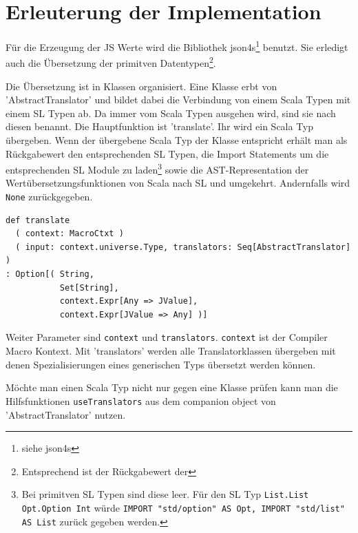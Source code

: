\documentclass[12pt]{scrreprt}
\begin{document}

\section{Erleuterung der Implementation}
\label{sec:trans-implementation}

Für die Erzeugung der JS Werte wird die Bibliothek json4s\footnote{siehe json4s} benutzt. Sie erledigt auch die Übersetzung der primitven Datentypen\footnote{Entsprechend ist der Rückgabewert der }.

Die Übersetzung ist in Klassen organisiert. Eine Klasse erbt von 'AbstractTranslator' und bildet dabei die Verbindung von einem Scala Typen mit einem \ac{SL} Typen ab. Da immer vom Scala Typen ausgehen wird, sind sie nach diesen benannt. Die Hauptfunktion ist 'translate'. Ihr wird ein Scala Typ übergeben. Wenn der übergebene Scala Typ der Klasse entspricht erhält man als Rückgabewert den entsprechenden \ac{SL} Typen, die Import Statements um die entsprechenden \ac{SL} Module zu laden\footnote{Bei primitven \ac{SL} Typen sind diese leer. Für den \ac{SL} Typ \lstinline!List.List Opt.Option Int! würde \lstinline!IMPORT "std/option" AS Opt, IMPORT "std/list" AS List! zurück gegeben werden.} sowie die \ac{AST}-Representation der Wertübersetzungsfunktionen von Scala nach \ac{SL} und umgekehrt. Andernfalls wird \lstinline!None! zurückgegeben.

\begin{lstlisting}[caption=Hauptfunktion in AbstractTranslator, label=lst:bsp2]
def translate
  ( context: MacroCtxt )
  ( input: context.universe.Type, translators: Seq[AbstractTranslator] )
: Option[( String, 
           Set[String], 
           context.Expr[Any => JValue], 
           context.Expr[JValue => Any] )]
\end{lstlisting}

Weiter Parameter sind \lstinline!context! und \lstinline!translators!. \lstinline!context! ist der Compiler Macro Kontext. Mit 'translators' werden alle Translatorklassen übergeben mit denen Spezialisierungen eines generischen Typs übersetzt werden können.

Möchte man einen Scala Typ nicht nur gegen eine Klasse prüfen kann man die Hilfsfunktionen \lstinline!useTranslators! aus dem companion object von 'AbstractTranslator' nutzen.
\end{document}
